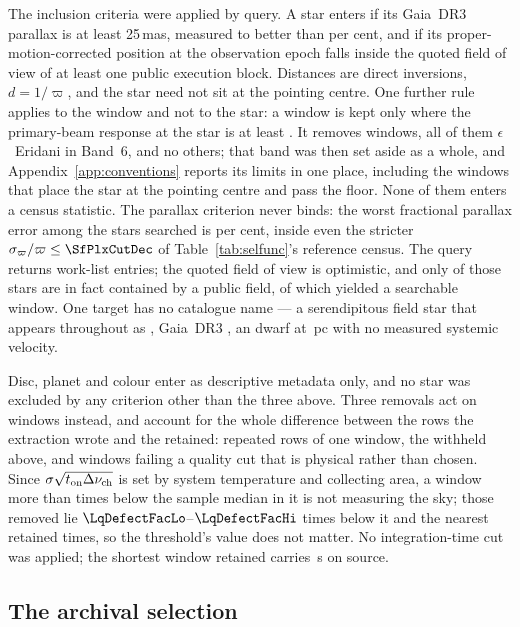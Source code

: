 The inclusion criteria were applied by query. A star enters
if its Gaia~DR3 parallax is at least 25\,mas, measured to better than
\PlxAdqlPct{} per cent, and if its proper-motion-corrected position at the
observation epoch falls inside the quoted field of view of at least one
public execution block. Distances are direct inversions, $d=1/\varpi$, and
the star need not sit at the pointing centre. One further rule applies to the
window and not to the star: a window is kept only where the primary-beam
response at the star is at least \PbFloorResp. It removes \EpsEriNOffAxis{}
windows, all of them $\epsilon$~Eridani in Band~6, and no others; that band
was then set aside as a whole, and Appendix~\ref{app:conventions} reports its
limits in one place, including the \EpsEriNOnAxis{} windows that place the
star at the pointing centre and pass the floor. None of them enters a census
statistic. The parallax
criterion never binds: the worst fractional parallax error among the stars
searched is \SfPlxWorstPct{} per cent, inside even the stricter
$\sigma_\varpi/\varpi\le\SfPlxCutDec$ of Table~\ref{tab:selfunc}'s
reference census. The query returns
\NCensus{} work-list entries; the quoted field of view is optimistic, and
only \NGenuinelyCovered{} of those stars are in fact contained by a public
field, of which \NStars{} yielded a searchable window. One target has no
catalogue name --- a serendipitous field star that appears throughout as
\BkAlmaName, Gaia~DR3 \BkAlmaGaia, an \BkAlmaSpType{} dwarf at
\BkAlmaDistPc\,pc with no measured systemic velocity.

Disc, planet and colour enter as descriptive metadata only, and no
star was excluded by any criterion other than the three above. Three removals
act on windows instead, and account for the whole difference between the
\LqNExport{} rows the extraction wrote and the \NWindows{} retained:
\NDup{} repeated rows of one window, the \NWithheld{} withheld above, and
\NDefect{} windows failing a quality cut that is physical rather than chosen.
Since $\sigma\sqrt{t_{\rm on}\Delta\nu_{\rm ch}}$ is set by system
temperature and collecting area, a window more than \LqDefectCut{} times
below the sample median in it is not measuring the sky; those removed lie
$\LqDefectFacLo$--$\LqDefectFacHi$ times below it and the nearest retained
\LqKeptFac{} times, so the threshold's value does not matter. No
integration-time cut was applied; the shortest window retained carries
\LqOnsrcMin\,s on source.

\subsection{The archival selection}
\label{sec:bias}


